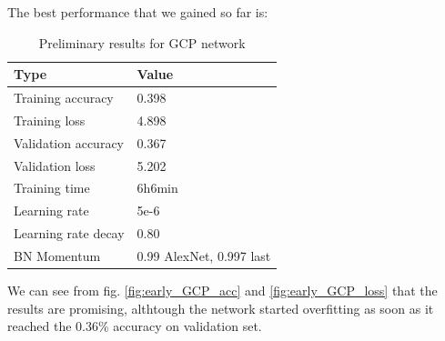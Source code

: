 The best performance that we gained so far is:
\begin{table}[!ht]
    \begin{center}
        \label{tab:GCP_early_results}
        \begin{tabular}{l|l}
            \rowcolor{gray!50}
            \textbf{Type} & \textbf{Value} \\
            \hline
            Training accuracy & 0.398\\
            Training loss & 4.898\\
            Validation accuracy & 0.367\\
            Validation loss & 5.202\\
            Training time & 6h6min\\
            Learning rate & 5e-6\\
            Learning rate decay & 0.80\\
            BN Momentum & 0.99 AlexNet, 0.997 last\\
            \hline
        \end{tabular}
    \end{center}
    \caption{Preliminary results for GCP network}
\end{table}
We can see from fig. \ref{fig:early_GCP_acc} and \ref{fig:early_GCP_loss} that the results are promising, althtough the network started overfitting as soon as it reached the 0.36\% accuracy on validation set.

